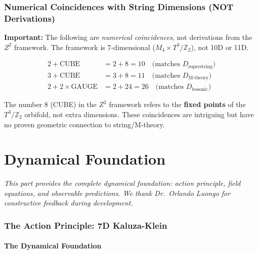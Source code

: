 \documentclass[11pt,a4paper]{article}
\theoremstyle{plain}
\theoremstyle{definition}
\theoremstyle{remark}
\newcommand{\CUBE}{\text{CUBE}}
\newcommand{\GAUGE}{\text{GAUGE}}
\begin{document}
\section{Numerical Coincidences with String Dimensions (NOT Derivations)}

\textbf{Important:} The following are \emph{numerical coincidences}, not derivations from the $Z^2$ framework. The framework is 7-dimensional ($M_4 \times T^3/\mathbb{Z}_2$), not 10D or 11D.

\begin{align}
2 + \CUBE &= 2 + 8 = 10 \quad \text{(matches } D_{\text{superstring}}\text{)} \\
3 + \CUBE &= 3 + 8 = 11 \quad \text{(matches } D_{\text{M-theory}}\text{)} \\
2 + 2 \times \GAUGE &= 2 + 24 = 26 \quad \text{(matches } D_{\text{bosonic}}\text{)}
\end{align}

The number 8 (CUBE) in the $Z^2$ framework refers to the \textbf{fixed points} of the $T^3/\mathbb{Z}_2$ orbifold, not extra dimensions. These coincidences are intriguing but have no proven geometric connection to string/M-theory.

\part{Dynamical Foundation}

\emph{This part provides the complete dynamical foundation: action principle, field equations, and observable predictions. We thank Dr.\ Orlando Luongo for constructive feedback during development.}

\section{The Action Principle: 7D Kaluza-Klein}

\subsection{The Dynamical Foundation}
\end{document}
